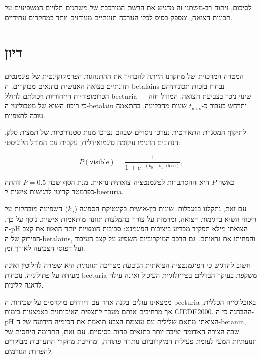 \begin{hebrew}לסיכום, ניתוח רב-משתני זה מדגיש את הרשת המורכבת של משתנים תלויים המשפיעים על תכונות הצואה, ומספק בסיס לכלי הערכה תזונתיים מעודנים יותר במחקרים עתידיים.\end{hebrew}

\section{\texthebrew{דיון}}

\begin{hebrew}המטרה המרכזית של מחקרנו הייתה להבהיר את ההתנהגות הפרמקוקינטית של פיגמנטים תזונתיים בצואה האנושית בתנאים מבוקרים. ה-\textenglish{betalains} נבחרו בזכות תכונותיהם הכרומופוריות הייחודיות ויכולתם לחולל \textenglish{beeturia} — שינוי ניכר בצביעת הצואה. המודל חזה כי ריכוז השיא של מטבוליטי ה-\textenglish{betalain} יתרחש כעבור כ-$t_{\max}$ שעות מהבליעה, בהתאמה טובה לתצפיות.\end{hebrew}

\begin{hebrew}לתיקוף המסגרת התאורטית נערכו ניסויים שבהם נצרכו מנות סטנדרטיות של תמצית סלק. הנתונים הדגימו עקומה סיגמואידלית, עקבית עם המודל הלוגיסטי:\end{hebrew}

$$P(\text{visible}) = \frac{1}{1 + e^{-(b_0 + b_1 \cdot \text{dose})}},$$

\begin{hebrew}כאשר $P$ היא ההסתברות לפיגמנטציה צואתית נראית. מנת הסף שבה $P = 0.5$ זוהתה כפרמטר קריטי לרגישות אישית ל-\textenglish{beeturia}.\end{hebrew}

\begin{hebrew}עם זאת, נתקלנו במגבלות. שונות בין-אישית בקינטיקת הספיגה ($k_a$) השפיעה מובהקות על ריכוזי השיא בדגימות הצואה, ומרמזת על צורך בהמלצות תזונה מותאמות אישית. נוסף על כך, ה-\textenglish{pH} הצואתי מילא תפקיד מכריע ביציבות הפיגמנט: סביבות חומציות יותר הואצו את קצב הפירוק של ה-\textenglish{betalains}, והפחיתו את נראותם. גם הרכב המיקרוביום השפיע על קצב העיבוד ועל דפוסי הצביעה לאורך זמן.\end{hebrew}

\begin{hebrew}חשוב להדגיש כי הפיגמנטציה הצואתית הנובעת מצריכה תזונתית היא שפירה לחלוטין ואינה מעידה על פתולוגיה. נוכחות \textenglish{beeturia} משקפת בעיקר הבדלים בפיזיולוגיית העיכול ואינה עילה לדאגה קלינית.\end{hebrew}

\begin{hebrew}ממצאינו עולים בקנה אחד עם דיווחים מוקדמים על שכיחות ה-\textenglish{beeturia} באוכלוסייה הכללית, אך מרחיבים אותם מעבר לתצפית האיכותנית באמצעות כימות \textenglish{CIEDE2000}. ההבחנה כי ה-\textenglish{pH} הצואתי מתאם שלילית עם עוצמת הצבע תואמת את הכימיה הידועה של ה-\textenglish{betanin}, שבה הצורה האדומה יציבה יותר בתנאים פחות בסיסיים. עם זאת, התרומה היחסית של תנועתיות המעי לעומת פעילות המיקרוביום נותרה פתוחה, ומחייבת מחקרי התערבות מבוקרים להפרדת הגורמים.\end{hebrew}

